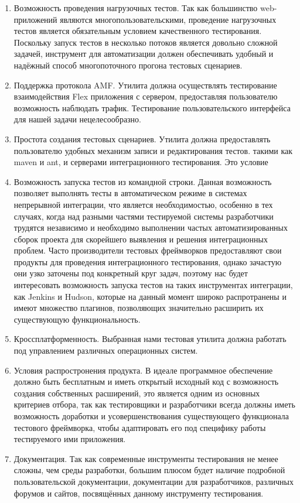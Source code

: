 \begin{enumerate}
\item Возможность проведения нагрузочных тестов. Так как большинство 
web-приложений являются многопользовательскими, проведение нагрузочных
тестов является обязательным условием качественного тестирования. Поскольку
запуск тестов в несколько потоков является довольно сложной задачей, 
инструмент для автоматизации должен обеспечивать удобный и надёжный способ 
многопоточного прогона тестовых сценариев.
\item Поддержка протокола AMF. Утилита должна осуществлять тестирование
взаимодействия Flex приложения с сервером, предоставляя пользователю возможность 
наблюдать трафик. Тестирование пользовательского интерфейса для нашей 
задачи нецелесообразно.
\item Простота создания тестовых сценариев. Утилита должна предоставлять 
пользователю удобных механизм записи и редактирования тестов.
такими как maven и ant, и серверами интеграционного тестирования. Это условие
\item Возможность запуска тестов из командной строки. Данная возможность позволяет
выполнять тесты в автоматическом режиме в системах непрерывной интеграции, что
является необходимостью, особенно в тех случаях, когда над разными частями
тестируемой системы разработчики трудятся независимо и необходимо 
выполнении частых автоматизированных сборок проекта для скорейшего 
выявления и решения интеграционных проблем. Часто производители тестовых 
фреймворков предоставляют свои продукты для проведения интеграционного тестирования, однако 
зачастую они узко заточены под конкретный круг задач, поэтому нас будет интересовать 
возможность запуска тестов на таких инструментах интеграции, как Jenkins и  
Hudson, которые на данный момент широко распротранены и имеют множество плагинов, позволяющих
значительно расширить их существующую функциональность.    
\item Кроссплатформенность. Выбранная нами тестовая утилита должна работать
под управлением различных операционных систем.
\item Условия распростронения продукта. В идеале программное обеспечение должно быть
бесплатным и иметь открытый исходный код с возможность создания собственных расширений,
это является одним из основных критериев отбора, так как тестировщики и разработчики
всегда должны иметь возможность доработки и усовершенствования существующего функционала
тестового фреймворка, чтобы адаптировать его под специфику работы тестируемого ими приложения.
\item Документация. Так как современные инструменты тестирования не менее сложны, чем среды
разработки, большим плюсом будет наличие подробной пользовательской документации,
документации для разработчиков, различных форумов и сайтов, посвящённых данному инструменту
тестирования.
\end{enumerate}


